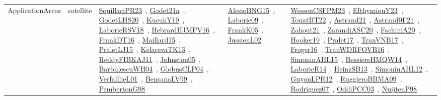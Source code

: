 {\begin{longtable}{lp{3cm}>{\raggedright\arraybackslash}p{6cm}>{\raggedright\arraybackslash}p{6cm}>{\raggedright\arraybackslash}p{8cm}}
\index{satellite}\index{ApplicationAreas!satellite}ApplicationAreas & satellite & \href{../works/SquillaciPR23.pdf}{SquillaciPR23}~\cite{SquillaciPR23}, \href{../works/Godet21a.pdf}{Godet21a}~\cite{Godet21a}, \href{../works/GodetLHS20.pdf}{GodetLHS20}~\cite{GodetLHS20}, \href{../works/KucukY19.pdf}{KucukY19}~\cite{KucukY19}, \href{../works/LaborieRSV18.pdf}{LaborieRSV18}~\cite{LaborieRSV18}, \href{../works/HebrardHJMPV16.pdf}{HebrardHJMPV16}~\cite{HebrardHJMPV16}, \href{../works/FrankDT16.pdf}{FrankDT16}~\cite{FrankDT16}, \href{../works/Maillard15.pdf}{Maillard15}~\cite{Maillard15}, \href{../works/PraletLJ15.pdf}{PraletLJ15}~\cite{PraletLJ15}, \href{../works/KelarevaTK13.pdf}{KelarevaTK13}~\cite{KelarevaTK13}, \href{../works/ReddyFIBKAJ11.pdf}{ReddyFIBKAJ11}~\cite{ReddyFIBKAJ11}, \href{../works/Johnston05.pdf}{Johnston05}~\cite{Johnston05}, \href{../works/BarbulescuWH04.pdf}{BarbulescuWH04}~\cite{BarbulescuWH04}, \href{../works/GlobusCLP04.pdf}{GlobusCLP04}~\cite{GlobusCLP04}, \href{../works/VerfaillieL01.pdf}{VerfaillieL01}~\cite{VerfaillieL01}, \href{../works/BensanaLV99.pdf}{BensanaLV99}~\cite{BensanaLV99}, \href{../works/PembertonG98.pdf}{PembertonG98}~\cite{PembertonG98} & \href{../works/AlesioBNG15.pdf}{AlesioBNG15}~\cite{AlesioBNG15}, \href{../works/Laborie09.pdf}{Laborie09}~\cite{Laborie09}, \href{../works/FrankK05.pdf}{FrankK05}~\cite{FrankK05}, \href{../works/JussienL02.pdf}{JussienL02}~\cite{JussienL02} & \href{../works/WessenCSFPM23.pdf}{WessenCSFPM23}~\cite{WessenCSFPM23}, \href{../works/EfthymiouY23.pdf}{EfthymiouY23}~\cite{EfthymiouY23}, \href{../works/TouatBT22.pdf}{TouatBT22}~\cite{TouatBT22}, \href{../works/Astrand21.pdf}{Astrand21}~\cite{Astrand21}, \href{../works/Astrand0F21.pdf}{Astrand0F21}~\cite{Astrand0F21}, \href{../works/Zahout21.pdf}{Zahout21}~\cite{Zahout21}, \href{../works/ZarandiASC20.pdf}{ZarandiASC20}~\cite{ZarandiASC20}, \href{../works/FachiniA20.pdf}{FachiniA20}~\cite{FachiniA20}, \href{../works/Hooker19.pdf}{Hooker19}~\cite{Hooker19}, \href{../works/Pralet17.pdf}{Pralet17}~\cite{Pralet17}, \href{../works/TranVNB17.pdf}{TranVNB17}~\cite{TranVNB17}, \href{../works/Froger16.pdf}{Froger16}~\cite{Froger16}, \href{../works/TranWDRFOVB16.pdf}{TranWDRFOVB16}~\cite{TranWDRFOVB16}, \href{../works/SimoninAHL15.pdf}{SimoninAHL15}~\cite{SimoninAHL15}, \href{../works/BessiereHMQW14.pdf}{BessiereHMQW14}~\cite{BessiereHMQW14}, \href{../works/LaborieR14.pdf}{LaborieR14}~\cite{LaborieR14}, \href{../works/HeinzSB13.pdf}{HeinzSB13}~\cite{HeinzSB13}, \href{../works/SimoninAHL12.pdf}{SimoninAHL12}~\cite{SimoninAHL12}, \href{../works/GuyonLPR12.pdf}{GuyonLPR12}~\cite{GuyonLPR12}, \href{../works/RuggieroBBMA09.pdf}{RuggieroBBMA09}~\cite{RuggieroBBMA09}, \href{../works/Rodriguez07.pdf}{Rodriguez07}~\cite{Rodriguez07}, \href{../works/OddiPCC03.pdf}{OddiPCC03}~\cite{OddiPCC03}, \href{../works/NuijtenP98.pdf}{NuijtenP98}~\cite{NuijtenP98}\\

\end{longtable}}
